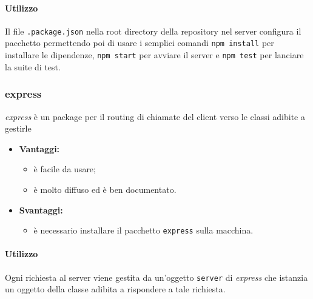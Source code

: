 				\paragraph{Utilizzo}
				Il file \texttt{.package.json} nella root directory della repository nel server configura il pacchetto permettendo poi di usare i semplici comandi \texttt{npm install} per installare le dipendenze, \texttt{npm start} per avviare il server e \texttt{npm test} per lanciare la suite di test.

				\subsubsection{express}
				\textit{express} è un package per il routing di chiamate del client verso le classi adibite a gestirle

					\begin{itemize}
						\item \textbf{Vantaggi:}
							\begin{itemize}
								\item è facile da usare;
								\item è molto diffuso ed è ben documentato.
							\end{itemize}
						\item \textbf{Svantaggi:}
							\begin{itemize}
								\item è necessario installare il pacchetto \texttt{express} sulla macchina.
							\end{itemize}
					\end{itemize}
					\paragraph{Utilizzo}
					Ogni richiesta al server viene gestita da un'oggetto \texttt{server} di \textit{express} che istanzia un oggetto della classe adibita a rispondere a tale richiesta.
